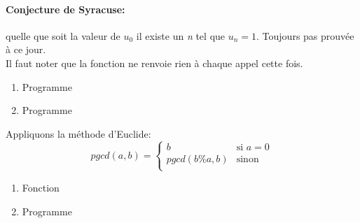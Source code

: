 \documentclass[a4paper,11pt]{article}
\begin{document}
\begin{Form}
\begin{exo}
\begin{commentprof}
\paragraph{Conjecture de Syracuse:} quelle que soit la valeur de $u_0$ il existe un \emph{n} tel que $u_n=1$. Toujours pas prouvée à ce jour.\\
Il faut noter que la fonction ne renvoie rien à chaque appel cette fois.
\end{commentprof}
\end{exo}
\begin{exo}
\begin{enumerate}
\item Programme

\item Programme

\end{enumerate}
\end{exo}
\begin{exo}
Appliquons la méthode d'Euclide:
$$
pgcd(a,b) = \left\{
    \begin{array}{ll}
        b & \mbox{si } a=0\\
        pgcd(b\%a,b) & \mbox{sinon}\\
    \end{array}
\right.
$$

\end{exo}
\begin{exo}

\end{exo}
\begin{exo}
\begin{enumerate}
\item Fonction

\item Programme

\end{enumerate}
\end{exo}
\end{Form}
\end{document}
